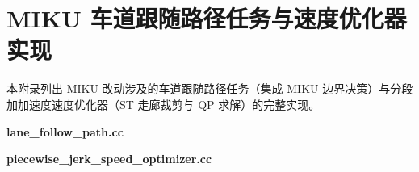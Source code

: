 

\chapter{MIKU 车道跟随路径任务与速度优化器实现}
\label{appendix:lane-speed}

\songti
本附录列出 MIKU 改动涉及的车道跟随路径任务（集成 MIKU 边界决策）与分段加加速度速度优化器（ST 走廊裁剪与 QP 求解）的完整实现。

\vspace{6pt}
\noindent\textbf{lane\_follow\_path.cc}



\vspace{6pt}
\noindent\textbf{piecewise\_jerk\_speed\_optimizer.cc}


